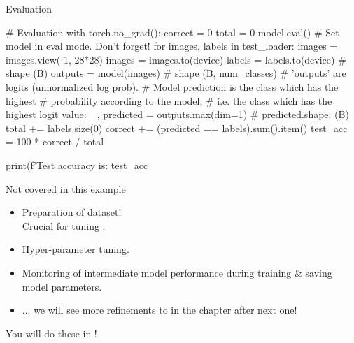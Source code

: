 \begin{frame}[fragile]{Evaluation}
\vspace{-5mm}
\begin{python}
# Evaluation
with torch.no_grad():
    correct = 0
    total = 0
    model.eval()  # Set model in eval mode. Don't forget!
    for images, labels in test_loader:
        images = images.view(-1, 28*28)
        images = images.to(device)
        labels = labels.to(device)  # shape (B)
        outputs = model(images)  # shape (B, num_classes)
        # 'outputs' are logits (unnormalized log prob).
        # Model prediction is the class which has the highest
        # probability according to the model,
        # i.e. the class which has the highest logit value:
        _, predicted = outputs.max(dim=1)
        # predicted.shape: (B)
        total += labels.size(0)
        correct += (predicted == labels).sum().item()
    test_acc = 100 * correct / total

print(f'Test accuracy is: {test_acc} %
\end{python}

%
\end{frame}


\begin{frame}{Not covered in this example}
\begin{itemize}
\item Preparation of  dataset!\\ Crucial for tuning .
\item Hyper-parameter tuning.
\item Monitoring of intermediate model performance during training \& saving model parameters.
\item ... we will see more refinements to in the chapter after next one!
\end{itemize}
\vsp
You will do these in !
\end{frame}

